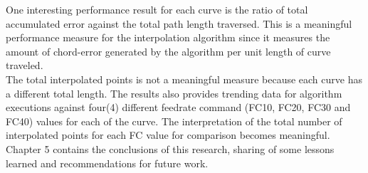 One interesting performance result for each curve is the ratio of total accumulated error against the total path length traversed. This is a meaningful performance measure for the interpolation algorithm since it measures the amount of chord-error generated by the algorithm per unit length of curve traveled. \\

The total interpolated points is not a meaningful measure because each curve has a different total length. The results also provides trending data for algorithm executions against four(4) different feedrate command (FC10, FC20, FC30 and FC40) values for each of the curve. The interpretation of the total number of interpolated points for each FC value for comparison becomes meaningful.\\

Chapter 5 contains the conclusions of this research, sharing of some lessons learned and recommendations for future work.





